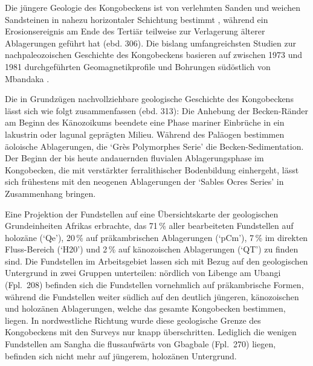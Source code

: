 Die jüngere Geologie des Kongobeckens ist von verlehmten Sanden und weichen Sandsteinen in nahezu horizontaler Schichtung bestimmt \parencite[302, 303 Abb.~2]{Giresse.2005b}, während ein Erosionsereignis am Ende des Tertiär teilweise zur Verlagerung älterer Ablagerungen geführt hat (ebd. 306). Die bislang umfangreichsten Studien zur nachpaleozoischen Geschichte des Kongobeckens \parencites{Daly.1991}{Daly.1992} basieren auf zwischen 1973 und 1981 durchgeführten Geomagnetikprofile und Bohrungen südöstlich von Mbandaka \parencite[301f.]{Giresse.2005b}.

Die in Grundzügen nachvollziehbare geologische Geschichte des Kongobeckens lässt sich wie folgt zusammenfassen (ebd. 313): Die Anhebung der Becken-Ränder am Beginn des Känozoikums beendete eine Phase mariner Einbrüche in ein lakustrin oder lagunal geprägten Milieu. Während des Paläogen bestimmen äoloische Ablagerungen, die \enquote*{Grès Polymorphes Serie} die Becken-Sedimentation. Der Beginn der bis heute andauernden fluvialen Ablagerungsphase im Kongobecken, die mit verstärkter ferralithischer Bodenbildung einhergeht, lässt sich frühestens mit den neogenen Ablagerungen der \enquote*{Sables Ocres Series} in Zusammenhang bringen.

Eine Projektion der Fundstellen auf eine Übersichtskarte der geologischen Grundeinheiten Afrikas \parencite{Persits.2002} erbrachte, das 71\,\% aller bearbeiteten Fundstellen auf holozäne (\enquote*{Qe}), 20\,\% auf präkambrischen Ablagerungen (\enquote*{pCm}), 7\,\% im direkten Fluss-Bereich (\enquote*{H20}) und 2\,\% auf känozoischen Ablagerungen (\enquote*{QT}) zu finden sind. Die Fundstellen im Arbeitsgebiet lassen sich mit Bezug auf den geologischen Untergrund in zwei Gruppen unterteilen: nördlich von Libenge am Ubangi (Fpl.~208) befinden sich die Fundstellen vornehmlich auf präkambrische Formen, während die Fundstellen weiter südlich auf den deutlich jüngeren, känozoischen und holozänen Ablagerungen, welche das gesamte Kongobecken bestimmen, liegen. In nordwestliche Richtung wurde diese geologische Grenze des Kongobeckens mit den Surveys nur knapp überschritten. Lediglich die wenigen Fundstellen am Sangha die flussaufwärts von Gbagbale (Fpl.~270) liegen, befinden sich nicht mehr auf jüngerem, holozänen Untergrund.


